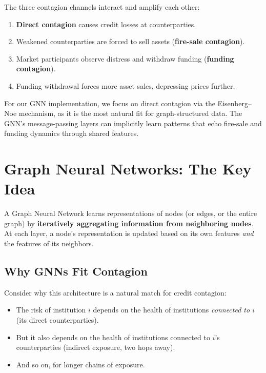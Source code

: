 \documentclass[11pt, a4paper]{article}
\theoremstyle{definition}
\theoremstyle{plain}
\theoremstyle{remark}
\begin{document}
\begin{keyresult}
The three contagion channels interact and amplify each other:
\begin{enumerate}
    \item \textbf{Direct contagion} causes credit losses at counterparties.
    \item Weakened counterparties are forced to sell assets (\textbf{fire-sale contagion}).
    \item Market participants observe distress and withdraw funding
          (\textbf{funding contagion}).
    \item Funding withdrawal forces more asset sales, depressing prices further.
\end{enumerate}
For our GNN implementation, we focus on direct contagion via the Eisenberg--Noe
mechanism, as it is the most natural fit for graph-structured data.
The GNN's message-passing layers can implicitly learn patterns that echo
fire-sale and funding dynamics through shared features.
\end{keyresult}

\section{Graph Neural Networks: The Key Idea}
\label{sec:gnn-key-idea}

A Graph Neural Network learns representations of nodes (or edges, or the entire
graph) by \textbf{iteratively aggregating information from neighboring nodes}.
At each layer, a node's representation is updated based on its own features
\emph{and} the features of its neighbors.

\subsection{Why GNNs Fit Contagion}

Consider why this architecture is a natural match for credit contagion:
\begin{itemize}
    \item The risk of institution $i$ depends on the health of institutions
          \emph{connected to $i$} (its direct counterparties).
    \item But it also depends on the health of institutions connected to $i$'s
          counterparties (indirect exposure, two hops away).
    \item And so on, for longer chains of exposure.
\end{itemize}
\end{document}
